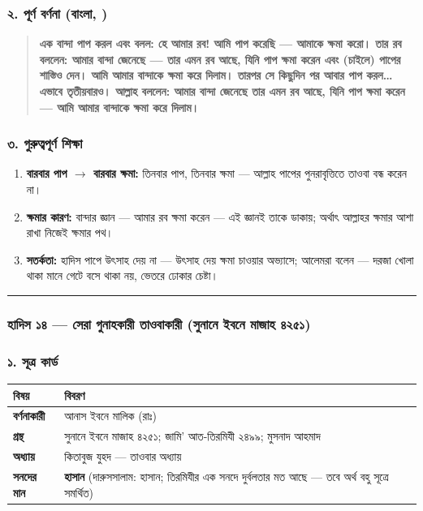 \subsubsection*{২. পূর্ণ বর্ণনা (বাংলা, )}

\begin{quote}
\textbf{এক বান্দা পাপ করল এবং বলল: হে আমার রব! আমি পাপ করেছি — আমাকে ক্ষমা করো। তার রব বললেন: আমার বান্দা জেনেছে — তার এমন রব আছে, যিনি পাপ ক্ষমা করেন এবং (চাইলে) পাপের শাস্তিও দেন। আমি আমার বান্দাকে ক্ষমা করে দিলাম। তারপর সে কিছুদিন পর আবার পাপ করল… এভাবে তৃতীয়বারও। আল্লাহ বললেন: আমার বান্দা জেনেছে তার এমন রব আছে, যিনি পাপ ক্ষমা করেন — আমি আমার বান্দাকে ক্ষমা করে দিলাম।}
\end{quote}

\subsubsection*{৩. গুরুত্বপূর্ণ শিক্ষা}

\begin{enumerate}
\item \textbf{বারবার পাপ $\rightarrow$ বারবার ক্ষমা:} তিনবার পাপ, তিনবার ক্ষমা — আল্লাহ পাপের পুনরাবৃত্তিতে তাওবা বন্ধ করেন না।
\item \textbf{ক্ষমার কারণ:} বান্দার জ্ঞান — আমার রব ক্ষমা করেন — এই জ্ঞানই তাকে ডাকায়; অর্থাৎ আল্লাহর ক্ষমার আশা রাখা নিজেই ক্ষমার পথ।
\item \textbf{সতর্কতা:} হাদিস পাপে উৎসাহ দেয় না — উৎসাহ দেয় ক্ষমা চাওয়ার অভ্যাসে; আলেমরা বলেন — দরজা খোলা থাকা মানে গেটে বসে থাকা নয়, ভেতরে ঢোকার চেষ্টা।
\end{enumerate}
\medskip\hrule\medskip

\subsubsection*{হাদিস ১৪ — সেরা গুনাহকারী তাওবাকারী (সুনানে ইবনে মাজাহ ৪২৫১)}

\subsubsection*{১. সূত্র কার্ড}

\begin{table}[h]\centering\small
\begin{tabular}{ll}
বিষয় & বিবরণ \\
\hline
\textbf{বর্ণনাকারী} & আনাস ইবনে মালিক (রাঃ) \\
\textbf{গ্রন্থ} & সুনানে ইবনে মাজাহ ৪২৫১; জামি' আত-তিরমিযী ২৪৯৯; মুসনাদ আহমাদ \\
\textbf{অধ্যায়} & কিতাবুজ যুহদ — তাওবার অধ্যায় \\
\textbf{সনদের মান} & \textbf{হাসান} (দারুসসালাম: হাসান; তিরমিযীর এক সনদে দুর্বলতার মত আছে — তবে অর্থ বহু সূত্রে সমর্থিত) \\
\hline
\end{tabular}
\end{table}

